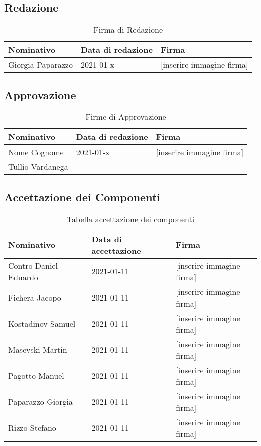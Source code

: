 \documentclass[../piano_di_progetto.tex]{subfiles}
\begin{document}
\subsection{Redazione}%
\label{sub:red}

\begin{table}[!ht]
	\centering
	\begin{tabular}{|l|l|l|}
		\hline
		\rowcolor{lightgray}
		\textbf{Nominativo} & \textbf{Data di redazione} & \textbf{Firma} \\ 
		\hline
			Giorgia Paparazzo & 2021-01-x &  [inserire immagine firma] \\
		\hline
	\end{tabular}
	\caption{Firma di Redazione}
\end{table}


\subsection{Approvazione}%
\label{sub:app}

\begin{table}[!ht]
	\centering
	\begin{tabular}{|l|l|l|}
		\hline
		\rowcolor{lightgray}
		\textbf{Nominativo} & \textbf{Data di redazione} & \textbf{Firma} \\ 

		\hline
			Nome Cognome & 2021-01-x &  [inserire immagine firma] \\
		\hline
			Tullio Vardanega & & \\
		\hline
	\end{tabular}
		\caption{Firme di Approvazione}
\end{table}


\subsection{Accettazione dei Componenti}%
\label{sub:acc_comp}


\begin{table}[!ht]
	\centering
	\begin{tabular}{|l|l|l|}
		\hline
		\rowcolor{lightgray}
		\textbf{Nominativo} & \textbf{Data di accettazione} & \textbf{Firma} \\ 
		\hline
		Contro Daniel Eduardo & 2021-01-11 & [inserire immagine firma] \\ 
		\hline
		Fichera Jacopo & 2021-01-11 & [inserire immagine firma] \\ 
		\hline
		Kostadinov Samuel & 2021-01-11 & [inserire immagine firma] \\
		\hline
		Masevski Martin & 2021-01-11 & [inserire immagine firma] \\ 
		\hline
		Pagotto Manuel & 2021-01-11 & [inserire immagine firma]  \\ 
		\hline
		Paparazzo Giorgia & 2021-01-11 & [inserire immagine firma] \\
		\hline
		Rizzo Stefano & 2021-01-11 &[inserire immagine firma] \\ 
		\hline

	\end{tabular}
		\caption{Tabella accettazione dei componenti}
\end{table}
\end{document}
